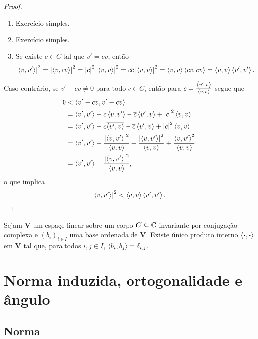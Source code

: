 \begin{proof}
	\begin{enumerate}
	\item Exercício simples.
	\item Exercício simples.
	\item Se existe $c \in C$ tal que $v'=cv$, então
		\begin{equation*}
		\abs{\inte{v}{v'}}^2 =\abs{\inte{v}{cv}}^2 = \abs{c}^2\abs{\inte{v}{v}}^2 = c\conju{c}\abs{\inte{v}{v}}^2 = \inte{v}{v}\inte{cv}{cv} = \inte{v}{v}\inte{v'}{v'}.
		\end{equation*}
	\end{enumerate}

Caso contrário, se $v'-cv \neq 0$ para todo $c \in C$, então para $c=\frac{\inte{v'}{v}}{\inte{v}{v}}$ segue que
	\begin{align*}
	0 &< \inte{v'-cv}{v'-cv} \\
		&= \inte{v'}{v'} - c\inte{v}{v'} - \conju{c}\inte{v'}{v} + \abs{c}^2\inte{v}{v} \\
		&= \inte{v'}{v'} - c\conju{\inte{v'}{v}} - \conju{c}\inte{v'}{v} + \abs{c}^2\inte{v}{v} \\
		&= \inte{v'}{v'} - \frac{\abs{\inte{v}{v'}}^2}{\inte{v}{v}} - \frac{\abs{\inte{v}{v'}}^2}{\inte{v}{v}} + \frac{\inte{v}{v'}^2}{\inte{v}{v}} \\
		&=  \inte{v'}{v'} - \frac{\abs{\inte{v}{v'}}^2}{\inte{v}{v}},
	\end{align*}
o que implica
	\begin{equation*}
	\abs{\inte{v}{v'}}^2 < \inte{v}{v}\inte{v'}{v'}.
	\end{equation*}
\end{proof}

\begin{proposition}
Sejam $\bm V$ um espaço linear sobre um corpo $\bm C \subseteq \C$ invariante por conjugação complexa e $(b_i)_{i \in I}$ uma base ordenada de $\bm V$. Existe único produto interno $\inte{\var}{\var}$ em $\bm V$ tal que, para todos $i,j \in I$, $\inte{b_i}{b_j}=\delta_{i,j}$.
\end{proposition}

\section{Norma induzida, ortogonalidade e ângulo}

\subsection{Norma}

